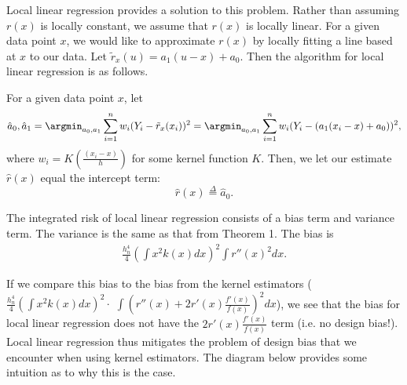 Local linear regression provides a solution to this problem. Rather than assuming $r(x)$ is locally constant, we assume that $r(x)$ is locally linear. For a given data point $x$, we would like to approximate $r(x)$ by locally fitting a line based at $x$ to our data. Let $\tilde{r}_x(u) = a_1(u - x) + a_0$. Then the algorithm for local linear regression is as follows. 

For a given data point $x$, let \begin{equation}\hat a_0, \hat a_1 = \argmin_{a_0, a_1} \sum_{i=1}^n w_i(Y_i - \tilde{r}_x(x_i))^2 = \argmin_{a_0, a_1} \sum_{i=1}^n w_i(Y_i - (a_1(x_i - x) + a_0))^2,\end{equation}
where $w_i = K\left(\frac{(x_i-x)}{h}\right)$ for some kernel function $K$. Then, we let our estimate $\hat r(x)$ equal the intercept term: 
\begin{equation}
	\hat r(x) \stackrel{\Delta}{=} \hat a_0.
\end{equation}
\begin{theorem} The integrated risk of local linear regression consists of a bias term and variance term. The variance is the same as that from Theorem 1. The bias is \begin{align}
	\frac{h_n^4}{4}\left(\int x^2 k(x) dx\right)^2 \int r''(x)^2 dx.
\end{align}
\end{theorem}
If we compare this bias to the bias from the kernel estimators ($\frac{h_n^4}{4}(\int x^2 k(x) dx)^2 \cdot$ $\int (r''(x) + 2r'(x) \frac{f'(x)}{f(x)})^2dx$), we see that the bias for local linear regression does not have the $2r'(x) \frac{f'(x)}{f(x)}$ term (i.e. no design bias!). Local linear regression thus mitigates the problem of design bias that we encounter when using kernel estimators. The diagram below provides some intuition as to why this is the case.

